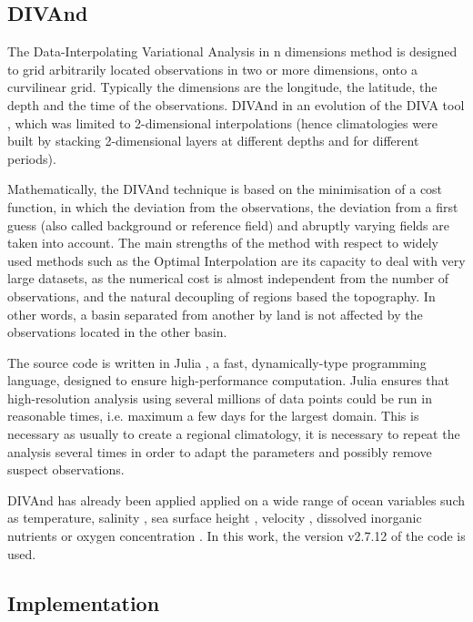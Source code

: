 \documentclass[essd, manuscript]{copernicus}
\begin{document}
\subsection{DIVAnd\label{sec:divandmethod}}

The Data-Interpolating Variational Analysis in n dimensions method \citep[DIVAnd][]{BARTH2014} is designed to grid arbitrarily located observations in two or more dimensions, onto a curvilinear grid. Typically the dimensions are the longitude, the latitude, the depth and the time of the observations. DIVAnd in an evolution of the DIVA tool \citep{TROUPIN2012,BECKERS2014}, which was limited to 2-dimensional interpolations (hence climatologies were built by stacking 2-dimensional layers at different depths and for different periods). 

Mathematically, the DIVAnd technique is based on the minimisation of a cost function, in which the deviation from the observations, the deviation from a first guess (also called background or reference field) and abruptly varying fields are taken into account. The main strengths of the method with respect to widely used methods such as the Optimal Interpolation \citep[OI,][]{GANDIN1966,BRETHERTON1976} are its capacity to deal with very large datasets, as the numerical cost is almost independent from the number of observations, and the natural decoupling of regions based the topography. In other words, a basin separated from another by land is not affected by the observations located in the other basin.

The source code is written in Julia \citep{Bezanson2017}, a fast, dynamically-type programming language, designed to ensure high-performance computation. Julia ensures that high-resolution analysis using several millions of data points could be run in reasonable times, i.e. maximum a few days for the largest domain. This is necessary as usually to create a regional climatology, it is necessary to repeat the analysis several times in order to adapt the parameters and possibly remove suspect observations.

DIVAnd has already been applied applied on a wide range of ocean variables such as temperature, salinity \citep{COATANOAN2021}, sea surface height \citep{DOGLIONI2023}, velocity \citep{TROUPIN2022}, dissolved inorganic nutrients \citep{BELGACEM2021} or oxygen concentration \citep{CLIMATO2023}. In this work, the version v2.7.12 of the code \citep{BARTH2024DIVAnd} is used.

\subsection{Implementation}
\end{document}
